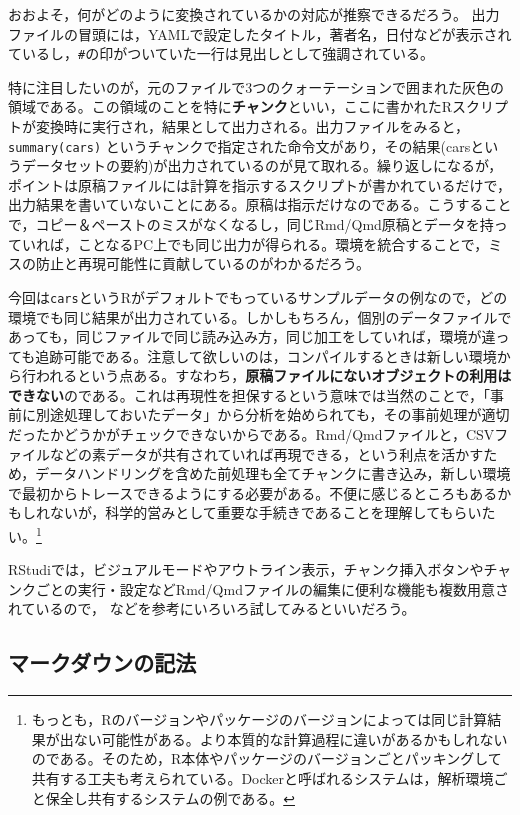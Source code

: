 \documentclass[
  a4paper,
]{ltjsbook}
\begin{document}
おおよそ，何がどのように変換されているかの対応が推察できるだろう。
出力ファイルの冒頭には，YAMLで設定したタイトル，著者名，日付などが表示されているし，\texttt{\#}の印がついていた一行は見出しとして強調されている。

特に注目したいのが，元のファイルで3つのクォーテーションで囲まれた灰色の領域である。この領域のことを特に\textbf{チャンク}といい，ここに書かれたRスクリプトが変換時に実行され，結果として出力される。出力ファイルをみると，\texttt{summary(cars)}
というチャンクで指定された命令文があり，その結果(carsというデータセットの要約)が出力されているのが見て取れる。繰り返しになるが，ポイントは原稿ファイルには計算を指示するスクリプトが書かれているだけで，出力結果を書いていないことにある。原稿は指示だけなのである。こうすることで，コピー＆ペーストのミスがなくなるし，同じRmd/Qmd原稿とデータを持っていれば，ことなるPC上でも同じ出力が得られる。環境を統合することで，ミスの防止と再現可能性に貢献しているのがわかるだろう。

今回は\texttt{cars}というRがデフォルトでもっているサンプルデータの例なので，どの環境でも同じ結果が出力されている。しかしもちろん，個別のデータファイルであっても，同じファイルで同じ読み込み方，同じ加工をしていれば，環境が違っても追跡可能である。注意して欲しいのは，コンパイルするときは新しい環境から行われるという点ある。すなわち，\textbf{原稿ファイルにないオブジェクトの利用はできない}のである。これは再現性を担保するという意味では当然のことで，「事前に別途処理しておいたデータ」から分析を始められても，その事前処理が適切だったかどうかがチェックできないからである。Rmd/Qmdファイルと，CSVファイルなどの素データが共有されていれば再現できる，という利点を活かすため，データハンドリングを含めた前処理も全てチャンクに書き込み，新しい環境で最初からトレースできるようにする必要がある。不便に感じるところもあるかもしれないが，科学的営みとして重要な手続きであることを理解してもらいたい。\footnote{もっとも，Rのバージョンやパッケージのバージョンによっては同じ計算結果が出ない可能性がある。より本質的な計算過程に違いがあるかもしれないのである。そのため，R本体やパッケージのバージョンごとパッキングして共有する工夫も考えられている。Dockerと呼ばれるシステムは，解析環境ごと保全し共有するシステムの例である。}

RStudiでは，ビジュアルモードやアウトライン表示，チャンク挿入ボタンやチャンクごとの実行・設定などRmd/Qmdファイルの編集に便利な機能も複数用意されているので，\autocite{Takahashi201805}
などを参考にいろいろ試してみるといいだろう。

\subsection{マークダウンの記法}\label{ux30deux30fcux30afux30c0ux30a6ux30f3ux306eux8a18ux6cd5}
\end{document}
